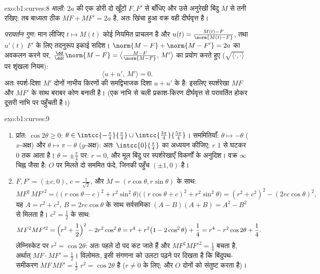 \begin{solution}{exo:b1:curves:8}
\emph{माली:} $2a$  की एक डोरी दो खूँटों $F, F'$ से बाँधिए और उसे
अनुरेखी बिंदु $M$ से तनी रखिए: तब बाध्यता ठीक $MF + MF' = 2a$ है, अतः खिंचा
हुआ वक्र वही दीर्घवृत्त है।

\emph{परावर्तन गुण:} मान लीजिए $t \mapsto M(t)$ कोई नियमित प्राचलन है और
$u(t) = \frac{M(t) - F}{\norm{M(t) - F}}$, तथा $u'(t)$ $F'$ के लिए तदनुरूप
इकाई सदिश। $\norm{M - F} + \norm{M - F'} = 2a$ का अवकलन करने पर,
$\frac{\dd}{\dd t}\norm{M - F} = \bigl\langle \frac{M - F}{\norm{M-F}},\,
M'\bigr\rangle$ का प्रयोग करते हुए ($\sqrt{\langle\cdot,\cdot\rangle}$ पर
शृंखला नियम):
\[
\bigl\langle u + u',\, M'\bigr\rangle = 0 .
\]
अतः स्पर्श-दिशा $M'$ दोनों नाभीय किरणों की समद्विभाजक दिशा $u + u'$ के
 है: इसलिए स्पर्शरेखा $MF$ और $MF'$ के साथ बराबर कोण बनाती है। (एक
नाभि से चली प्रकाश-किरण दीर्घवृत्त से परावर्तित होकर दूसरी नाभि पर पहुँचती
है।)
\end{solution}

\begin{solution}{exo:b1:curves:9}
\begin{enumerate}
  \item प्रांत: $\cos 2\theta \geq 0$: $\theta \in
  \intcc{-\frac\pi4}{\frac\pi4} \cup
  \intcc{\frac{3\pi}{4}}{\frac{5\pi}{4}}$। सममितियाँ: $\theta \mapsto
  -\theta$ ($x$-अक्ष) और $\theta \mapsto \pi - \theta$ ($y$-अक्ष): अतः
  $\intcc{0}{\frac\pi4}$ का अध्ययन कीजिए; $r$ $1$ से घटकर $0$ तक आता है।
  $\theta = \pm\frac\pi4$ पर: $r = 0$, और मूल बिंदु पर स्पर्शरेखाएँ विकर्णों
  के अनुदिश। वक्र $\infty$ चिह्न जैसा है: $O$ पर मिलते दो सममित फंदे, जिनकी
  पहुँच $(\pm 1, 0)$ है।
  \item $F, F' = (\pm c, 0)$, $c = \frac{1}{\sqrt 2}$, और $M = (r\cos\theta,
  r\sin\theta)$ के साथ:
        \[
        MF^2\, MF'^2
        = \bigl((r\cos\theta - c)^2 + r^2\sin^2\theta\bigr)
        \bigl((r\cos\theta + c)^2 + r^2\sin^2\theta\bigr)
        = (r^2 + c^2)^2 - (2rc\cos\theta)^2 ,
        \]
        यह $A = r^2 + c^2$, $B = 2rc\cos\theta$ के साथ सर्वसमिका $(A - B)(A
        + B) = A^2 - B^2$ से मिलता है। $c^2 = \frac12$ के साथ:
        \[
        MF^2 MF'^2 = \Bigl(r^2 + \frac12\Bigr)^2 - 2r^2\cos^2\theta
        = r^4 + r^2\bigl(1 - 2\cos^2\theta\bigr) + \frac14
        = r^4 - r^2\cos 2\theta + \frac14 .
        \]
        लेम्निस्केट पर $r^2 = \cos 2\theta$: अतः पहले दो पद कट जाते हैं और
        $MF^2MF'^2 = \frac14$ बचता है, अर्थात् $MF \cdot MF' = \frac12$।
        विलोमतः, इसी संगणना को उलटा पढ़ने पर दिखता है कि बिंदुपथ-समीकरण
        $MF\,MF' = \frac12$ $r^2 = \cos 2\theta$ है ($r \neq 0$ के लिए; और
        $O$ दोनों को संतुष्ट करता है)।
\end{enumerate}
\end{solution}


